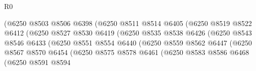 \begin{lexlean}{R0}
\begin{coremodule}
                                      (@6250
                                        @8503
                                        @8506
                                        @6398
                                        (@6250
                                          @8511
                                          @8514
                                          @6405
                                          (@6250
                                            @8519
                                            @8522
                                            @6412
                                            (@6250
                                              @8527
                                              @8530
                                              @6419
                                              (@6250
                                                @8535
                                                @8538
                                                @6426
                                                (@6250
                                                  @8543
                                                  @8546
                                                  @6433
                                                  (@6250
                                                    @8551
                                                    @8554
                                                    @6440
                                                    (@6250
                                                      @8559
                                                      @8562
                                                      @6447
                                                      (@6250
                                                        @8567
                                                        @8570
                                                        @6454
                                                        (@6250
                                                          @8575
                                                          @8578
                                                          @6461
                                                          (@6250
                                                            @8583
                                                            @8586
                                                            @6468
                                                            (@6250
                                                              @8591
                                                              @8594

\end{coremodule}
\end{lexlean}
